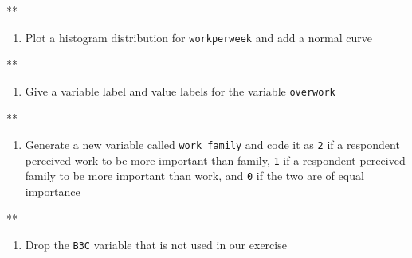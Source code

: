 \documentclass[
]{book}
\newenvironment{Shaded}{\begin{snugshade}}{\end{snugshade}}
\newcommand{\NormalTok}[1]{#1}
\providecommand{\tightlist}{%
  \setlength{\itemsep}{0pt}\setlength{\parskip}{0pt}}
\begin{document}
\begin{Shaded}
\begin{Highlighting}[]
\NormalTok{**}
\end{Highlighting}
\end{Shaded}

\begin{enumerate}
\def\labelenumi{\arabic{enumi}.}
\setcounter{enumi}{3}
\tightlist
\item
  Plot a histogram distribution for \texttt{workperweek} and add a normal curve
\end{enumerate}

\begin{Shaded}
\begin{Highlighting}[]
\NormalTok{**}
\end{Highlighting}
\end{Shaded}

\begin{enumerate}
\def\labelenumi{\arabic{enumi}.}
\setcounter{enumi}{4}
\tightlist
\item
  Give a variable label and value labels for the variable \texttt{overwork}
\end{enumerate}

\begin{Shaded}
\begin{Highlighting}[]
\NormalTok{**}
\end{Highlighting}
\end{Shaded}

\begin{enumerate}
\def\labelenumi{\arabic{enumi}.}
\setcounter{enumi}{5}
\tightlist
\item
  Generate a new variable called \texttt{work\_family} and code it as \texttt{2} if a respondent perceived work to be more important than family, \texttt{1} if a respondent perceived family to be more important than work, and \texttt{0} if the two are of equal importance
\end{enumerate}

\begin{Shaded}
\begin{Highlighting}[]
\NormalTok{**}
\end{Highlighting}
\end{Shaded}

\begin{enumerate}
\def\labelenumi{\arabic{enumi}.}
\setcounter{enumi}{6}
\tightlist
\item
  Drop the \texttt{B3C} variable that is not used in our exercise
\end{enumerate}
\end{document}
